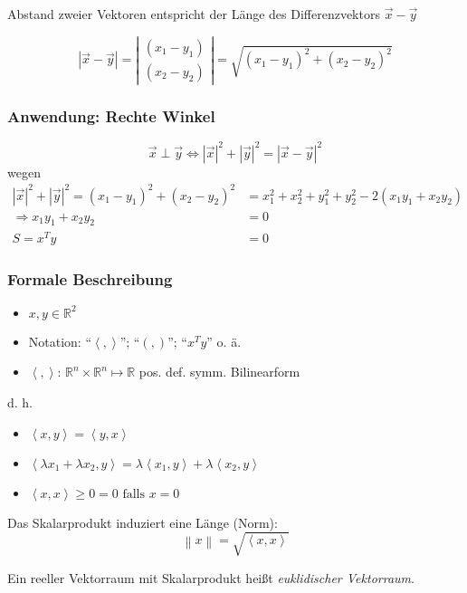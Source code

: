 \begin{note}
Abstand zweier Vektoren entspricht der Länge des Differenzvektors $\vec{x} - \vec{y}$
\end{note}

\begin{equation*}
	|\vec{x} - \vec{y}| = \left|
 	\begin{array}{cc}
		(x_1 - y_1)\\
		(x_2 - y_2)
 	\end{array}\right| = 
 	\sqrt{(x_1 - y_1)^2 + (x_2 - y_2)^2}
\end{equation*}

\subsubsection*{Anwendung: Rechte Winkel}

\begin{theorem}
\begin{equation*}
	\vec{x} \perp \vec{y} \Leftrightarrow |\vec{x}|^2 + |\vec{y}|^2 = |\vec{x} - \vec{y}|^2
\end{equation*}
wegen
\begin{align*}
	|\vec{x}|^2 + |\vec{y}|^2 = (x_1 - y_1)^2 + (x_2 - y_2)^2 &= x_1^2 + x_2^2 + y_1^2 + y_2^2 - 2(x_1 y_1 + x_2 y_2) \\
	\Rightarrow x_1 y_1 + x_2 y_2 &= 0 \\
	S = x^T y &= 0
\end{align*}
\end{theorem}

\subsubsection*{Formale Beschreibung}
\begin{definition}[Skalarprodukt]\flush
	\begin{itemize}
		\item $ x, y \in \mathbb{R}^2 $
		\item Notation: "`$ \left<, \right>$"'; "`$(, )$"'; "`$x^T y$"' o. ä.
		\item $\left<, \right>$: $\mathbb{R}^n \times \mathbb{R}^n \mapsto \mathbb{R}$ pos. def. symm. Bilinearform
	\end{itemize}
\end{definition}

\noindent d. h. \begin{itemize}
	\item $ \left<x, y\right> = \left<y, x\right>$
	\item $ \left<\lambda x_1 + \lambda x_2, y\right> = \lambda \left<x_1, y\right> + \lambda \left<x_2, y\right>$
	\item $ \left<x, x\right> \geq 0 = 0 \text{ falls } x = 0$
\end{itemize}
%
Das Skalarprodukt induziert eine Länge (Norm):
\begin{equation*}
	\left\| x \right\| = \sqrt{\left<x, x\right>}
\end{equation*}
%
\begin{definition}
  Ein reeller Vektorraum mit Skalarprodukt heißt \emph{euklidischer Vektorraum}.
\end{definition}

